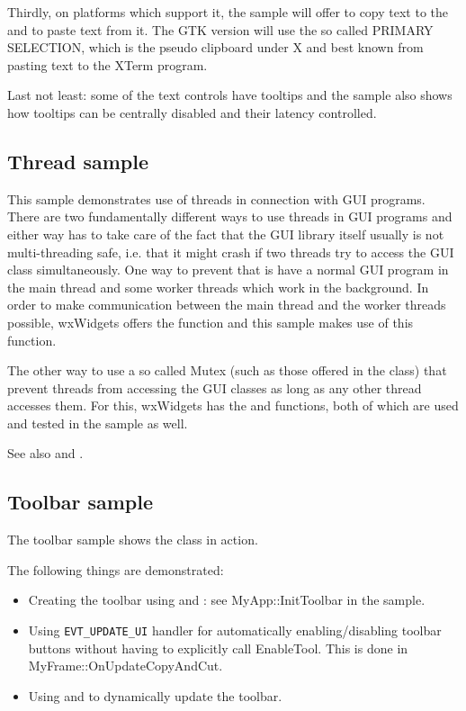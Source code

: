 Thirdly, on platforms which support it, the sample will offer to copy text to the
 and to paste text from it. The GTK version will
use the so called PRIMARY SELECTION, which is the pseudo clipboard under X and
best known from pasting text to the XTerm program.

Last not least: some of the text controls have tooltips and the sample also shows
how tooltips can be centrally disabled and their latency controlled.


\subsection{Thread sample}\label{samplethread}

This sample demonstrates use of threads in connection with GUI programs.
There are two fundamentally different ways to use threads in GUI programs and
either way has to take care of the fact that the GUI library itself usually
is not multi-threading safe, i.e. that it might crash if two threads try to
access the GUI class simultaneously. One way to prevent that is have a normal
GUI program in the main thread and some worker threads which work in the
background. In order to make communication between the main thread and the
worker threads possible, wxWidgets offers the 
function and this sample makes use of this function.

The other way to use a so called Mutex (such as those offered in the 
class) that prevent threads from accessing the GUI classes as long as any other
thread accesses them. For this, wxWidgets has the 
and  functions, both of which are
used and tested in the sample as well.

See also  and .


\subsection{Toolbar sample}\label{sampletoolbar}

The toolbar sample shows the  class in action.

The following things are demonstrated:

\begin{itemize}\itemsep=0pt
\item Creating the toolbar using 
and : see
MyApp::InitToolbar in the sample.
\item Using {\tt EVT\_UPDATE\_UI} handler for automatically enabling/disabling
toolbar buttons without having to explicitly call EnableTool. This is done
in MyFrame::OnUpdateCopyAndCut.
\item Using  and
 to dynamically update the
toolbar.
\end{itemize}

